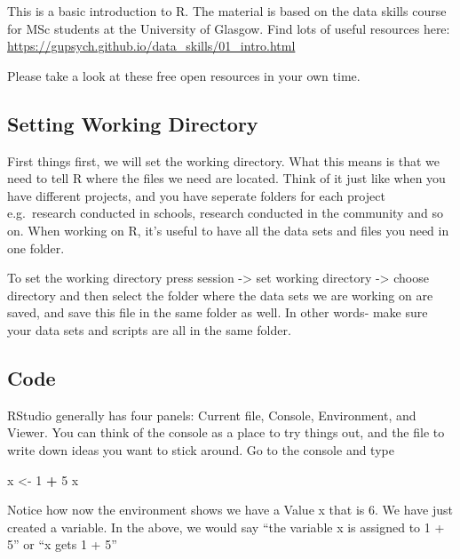 \documentclass[]{book}
\newenvironment{Shaded}{\begin{snugshade}}{\end{snugshade}}
\newcommand{\DecValTok}[1]{\textcolor[rgb]{0.00,0.00,0.81}{#1}}
\newcommand{\NormalTok}[1]{#1}
\newcommand{\OperatorTok}[1]{\textcolor[rgb]{0.81,0.36,0.00}{\textbf{#1}}}
\newcommand{\StringTok}[1]{\textcolor[rgb]{0.31,0.60,0.02}{#1}}
\begin{document}
This is a basic introduction to R. The material is based on the data skills course for MSc students at the University of Glasgow. Find lots of useful resources here: \url{https://gupsych.github.io/data_skills/01_intro.html}

Please take a look at these free open resources in your own time.

\hypertarget{setting-working-directory}{%
\subsection{Setting Working Directory}\label{setting-working-directory}}

First things first, we will set the working directory. What this means is that we need to tell R where the files we need are located. Think of it just like when you have different projects, and you have seperate folders for each project e.g.~research conducted in schools, research conducted in the community and so on. When working on R, it's useful to have all the data sets and files you need in one folder.

To set the working directory press session -\textgreater{} set working directory -\textgreater{} choose directory and then select the folder where the data sets we are working on are saved, and save this file in the same folder as well. In other words- make sure your data sets and scripts are all in the same folder.

\hypertarget{code}{%
\subsection{Code}\label{code}}

RStudio generally has four panels: Current file, Console, Environment, and Viewer. You can think of the console as a place to try things out, and the file to write down ideas you want to stick around. Go to the console and type

\begin{Shaded}
\begin{Highlighting}[]
\NormalTok{x <-}\StringTok{ }\DecValTok{1} \OperatorTok{+}\StringTok{ }\DecValTok{5}
\NormalTok{x}
\end{Highlighting}
\end{Shaded}

Notice how now the environment shows we have a Value x that is 6. We have just created a variable. In the above, we would say ``the variable x is assigned to 1 + 5'' or ``x gets 1 + 5''
\end{document}
